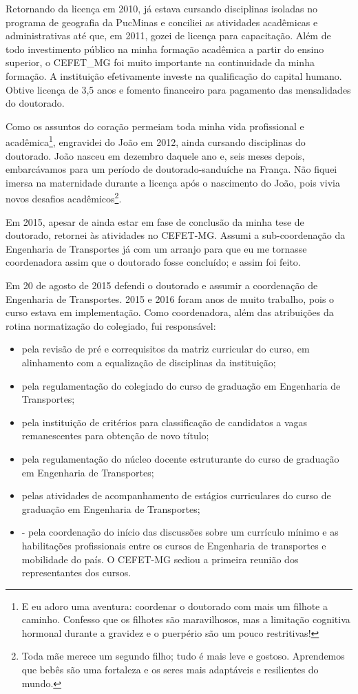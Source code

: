 \documentclass[
]{book}
\begin{document}
Retornando da licença em 2010, já estava cursando disciplinas isoladas
no programa de geografia da PucMinas e conciliei as atividades
acadêmicas e administrativas até que, em 2011, gozei de licença para
capacitação. Além de todo investimento público na minha formação
acadêmica a partir do ensino superior, o CEFET\_MG foi muito importante
na continuidade da minha formação. A instituição efetivamente investe na
qualificação do capital humano. Obtive licença de 3,5 anos e fomento
financeiro para pagamento das mensalidades do doutorado.

Como os assuntos do coração permeiam toda minha vida profissional e
acadêmica\footnote{E eu adoro uma aventura: coordenar o doutorado com
  mais um filhote a caminho. Confesso que os filhotes são maravilhosos,
  mas a limitação cognitiva hormonal durante a gravidez e o puerpério
  são um pouco restritivas!}, engravidei do João em 2012, ainda cursando
disciplinas do doutorado. João nasceu em dezembro daquele ano e, seis
meses depois, embarcávamos para um período de doutorado-sanduíche na
França. Não fiquei imersa na maternidade durante a licença após o
nascimento do João, pois vivia novos desafios acadêmicos\footnote{Toda
  mãe merece um segundo filho; tudo é mais leve e gostoso. Aprendemos
  que bebês são uma fortaleza e os seres mais adaptáveis e resilientes
  do mundo.}.

Em 2015, apesar de ainda estar em fase de conclusão da minha tese de
doutorado, retornei às atividades no CEFET-MG. Assumi a sub-coordenação
da Engenharia de Transportes já com um arranjo para que eu me tornasse
coordenadora assim que o doutorado fosse concluído; e assim foi feito.

Em 20 de agosto de 2015 defendi o doutorado e assumir a coordenação de
Engenharia de Transportes. 2015 e 2016 foram anos de muito trabalho,
pois o curso estava em implementação. Como coordenadora, além das
atribuições da rotina normatização do colegiado, fui responsável:

\begin{itemize}
\item
  pela revisão de pré e correquisitos da matriz curricular do curso, em
  alinhamento com a equalização de disciplinas da instituição;
\item
  pela regulamentação do colegiado do curso de graduação em Engenharia
  de Transportes;
\item
  pela instituição de critérios para classificação de candidatos a vagas
  remanescentes para obtenção de novo título;
\item
  pela regulamentação do núcleo docente estruturante do curso de
  graduação em Engenharia de Transportes;
\item
  pelas atividades de acompanhamento de estágios curriculares do curso
  de graduação em Engenharia de Transportes;
\item
  - pela coordenação do início das discussões sobre um currículo mínimo
  e as habilitações profissionais entre os cursos de Engenharia de
  transportes e mobilidade do país. O CEFET-MG sediou a primeira reunião
  dos representantes dos cursos.
\end{itemize}
\end{document}

